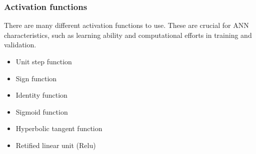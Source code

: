 \subsubsection{Activation functions}
There are many different activation functions to use. These are crucial for ANN characteristics, such as learning ability and computational efforts in training and validation.

\begin{itemize}
    \item Unit step function
    \item Sign function
    \item Identity function
    \item Sigmoid function
    \item Hyperbolic tangent function
    \item Retified linear unit (Relu) 
\end{itemize}

